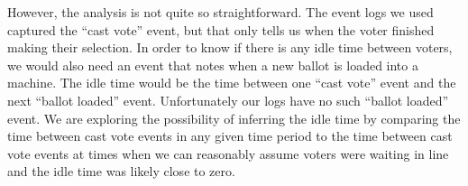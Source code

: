 However, the analysis is not quite so straightforward. The event logs
we used captured the \textquotedblleft cast vote'' event, but that
only tells us when the voter finished making their selection. In order
to know if there is any idle time between voters, we would also need
an event that notes when a new ballot is loaded into a machine. The
idle time would be the time between one \textquotedblleft cast vote''
event and the next \textquotedblleft ballot loaded''
event. Unfortunately our logs have no such \textquotedblleft ballot
loaded'' event. We are exploring the possibility of inferring the idle time by
comparing the time between cast vote events in any given time period to the time
between cast vote events at times when we can reasonably assume voters were
waiting in line and the idle time was likely close to zero.
\begin{comment}
Instead, we had to infer the idle time. We did this by
focusing on the polling locations which stayed opened after poll
closing time as we could conclude they were busy processing the voters
standing in line at that time and the time between cast vote events
includes no idle time. For those locations, we measure the time it
took voters to cast ballots during the extended poll hours. We also
calculate and keep track of the time per ballot cast during regular
poll hours. Using the Kolmogorov- Smirnov statistical test we can
determine whether the distribution of time between vote cast events
during regular poll hours, in one-hour time windows, matches the
distribution of time between vote cast events during the extended poll
hours. If the distribution of the two samples is consistent, we can
infer the possibility of long lines during the particular one-hour
time period. \footnote{The KS test starts with the null hypothesis
  that the two samples come from the same distribution, which is the
  situation we are interested in identifying. Therefore, the most we
  can say in the case that the null hypothesis cannot be rejected is, we
  cannot reject the possibility that there were long lines between a
  particular time window.} 
\end{comment}
